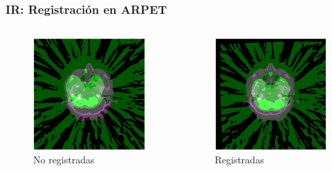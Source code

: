 \documentclass{beamer} %
\begin{document}
\begin{frame}
\frametitle{IR: Registración en ARPET}

\begin{columns}[onlytextwidth]
\begin{column}{.45\textwidth}
\begin{figure}
  \includegraphics[width=\textwidth]{images/7-unreg.eps}
  \caption{No registradas}
\end{figure}
\end{column}
\hfill
\begin{column}{.45\textwidth}
\begin{figure}
  \includegraphics[width=\textwidth]{images/7-reg.eps}
  \caption{Registradas}
\end{figure}
\end{column}
\end{columns}


\end{frame}
\end{document}
